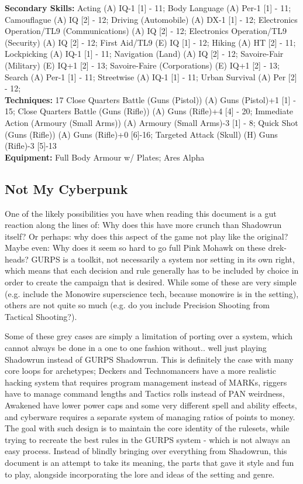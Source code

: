\begin{multicols*}{2}
	\textbf{Secondary Skills: }
	Acting (A) IQ-1 [1] - 11; Body Language (A) Per-1 [1] - 11;  Camouflague (A) IQ [2] - 12; Driving (Automobile) (A) DX-1 [1] - 12; Electronics Operation/TL9 (Communications) (A) IQ [2] - 12; Electronics Operation/TL9 (Security) (A) IQ [2] - 12; First Aid/TL9 (E) IQ [1] - 12; Hiking (A) HT [2] - 11; Lockpicking (A) IQ-1 [1] - 11; Navigation (Land) (A) IQ [2] - 12; Savoire-Fair (Military) (E) IQ+1 [2] - 13; Savoire-Faire (Corporations) (E) IQ+1 [2] - 13; Search (A) Per-1 [1] - 11; Streetwise (A) IQ-1 [1] - 11; Urban Survival (A) Per [2] - 12;\\
	
	\textbf{Techniques: } 17
	Close Quarters Battle (Guns (Pistol)) (A) Guns (Pistol)+1 [1] - 15; Close Quarters Battle (Guns (Rifle)) (A) Guns (Rifle)+4 [4] - 20; Immediate Action (Armoury (Small Arms)) (A) Armoury (Small Arms)-3 [1] - 8; Quick Shot (Guns (Rifle)) (A) Guns (Rifle)+0 [6]-16; Targeted Attack (Skull) (H) Guns (Rifle)-3 [5]-13\\
	
	\textbf{Equipment: }
	Full Body Armour w/ Plates; Ares Alpha
	
	\subsection{Not My Cyberpunk}
	
	One of the likely possibilities you have when reading this document is a gut reaction along the lines of: Why does this have more crunch than Shadowrun itself? Or perhaps: why does this aspect of the game not play like the original? Maybe even: Why does it seem so hard to go full Pink Mohawk on these drek-heads? GURPS is a toolkit, not necessarily a system nor setting in its own right, which means that each decision and rule generally has to be included by choice in order to create the campaign that is desired. While some of these are very simple (e.g. include the Monowire superscience tech, because monowire is in the setting), others are not quite so much (e.g. do you include Precision Shooting from Tactical Shooting?).
	
	Some of these grey cases are simply a limitation of porting over a system, which cannot always be done in a one to one fashion without.. well just playing Shadowrun instead of GURPS Shadowrun. This is definitely the case with many core loops for archetypes; Deckers and Technomancers have a more realistic hacking system that requires program management instead of MARKs, riggers have to manage command lengths and Tactics rolls instead of PAN weirdness, Awakened have lower power caps and some very different spell and ability effects, and cyberware requires a separate system of managing ratios of points to money. The goal with such design is to maintain the core identity of the rulesets, while trying to recreate the best rules in the GURPS system - which is not always an easy process. Instead of blindly bringing over everything from Shadowrun, this document is an attempt to take its meaning, the parts that gave it style and fun to play, alongside incorporating the lore and ideas of the setting and genre.
	

\end{multicols*}
